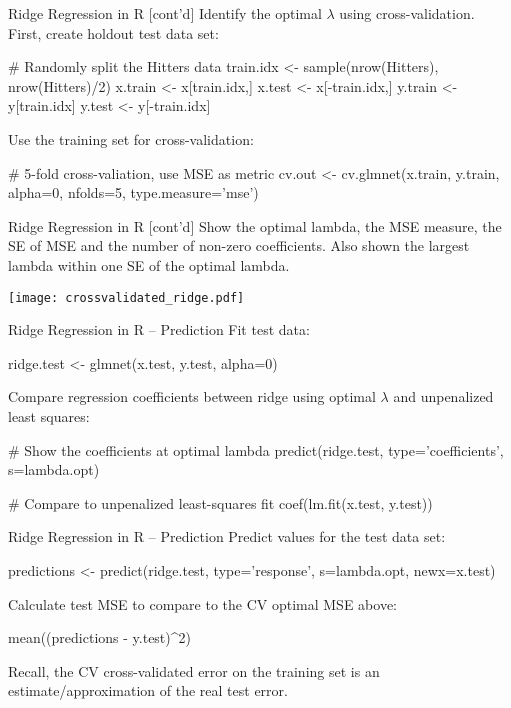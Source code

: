 \documentclass[ignorenonframetext,xcolor=x11names]{beamer}
\begin{document}
\begin{frame}[fragile]{Ridge Regression in R \small [cont'd]}
\small
Identify the optimal $\lambda$ using cross-validation. First, create holdout test data set:
\begin{Rcode}
# Randomly split the Hitters data
train.idx <- sample(nrow(Hitters), nrow(Hitters)/2)
x.train <- x[train.idx,]
x.test <- x[-train.idx,]
y.train <- y[train.idx]
y.test <- y[-train.idx]
\end{Rcode}
Use the training set for cross-validation:
\begin{Rcode}
# 5-fold cross-valiation, use MSE as metric
cv.out <- cv.glmnet(x.train, y.train, alpha=0, 
   nfolds=5, type.measure='mse')
\end{Rcode}
\end{frame}


\begin{frame}[fragile]{Ridge Regression in R \small [cont'd]}
\small
Show the optimal lambda, the MSE measure, the SE of MSE and the number of non-zero coefficients. Also shown the largest lambda within one SE of the optimal lambda.
\texttt{[image: crossvalidated\_ridge.pdf]}
\end{frame}

\begin{frame}[fragile]{Ridge Regression in R -- Prediction}
\small
Fit test data:
\begin{Rcode}
ridge.test <- glmnet(x.test, y.test, alpha=0)
\end{Rcode}
Compare regression coefficients between ridge using optimal $\lambda$ and unpenalized least squares:
\begin{Rcode}
# Show the coefficients at optimal lambda
predict(ridge.test, type='coefficients', s=lambda.opt)

# Compare to unpenalized least-squares fit
coef(lm.fit(x.test, y.test))
\end{Rcode}
\end{frame}


\begin{frame}[fragile]{Ridge Regression in R -- Prediction}
\small
Predict values for the test data set:
\begin{Rcode}
predictions <- predict(ridge.test, type='response', 
                       s=lambda.opt, newx=x.test)
\end{Rcode}
Calculate test MSE to compare to the CV optimal MSE above:
\begin{Rcode}
mean((predictions - y.test)^2)
\end{Rcode}
Recall, the CV cross-validated error on the training set is an estimate/approximation of the real test error.
\end{frame}
\end{document}
